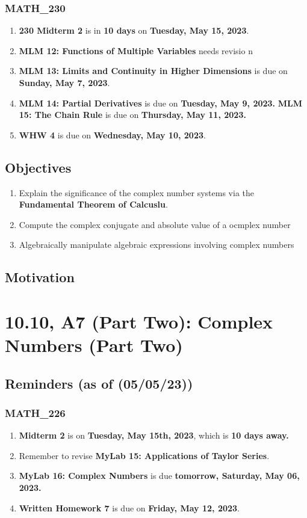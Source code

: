 \subsection{MATH\_230}
\begin{enumerate}
  \item \textbf{230 Midterm 2} is in \textbf{10 days} on
        \textbf{Tuesday, May 15, 2023}.
  \item \textbf{MLM 12: Functions of Multiple Variables} needs revisio n
  \item \textbf{MLM 13: Limits and Continuity in Higher
        Dimensions} is due on \textbf{Sunday, May 7, 2023}.
  \item \textbf{MLM 14: Partial Derivatives} is due on
        \textbf{Tuesday, May 9, 2023.}
        \textbf \textbf{MLM 15: The Chain Rule} is due on
        \textbf{Thursday, May 11, 2023.}
  \item \textbf{WHW 4} is due on \textbf{Wednesday,
        May 10, 2023}.

\end{enumerate}

\section{Objectives}
\begin{enumerate}
  \item Explain the significance of the complex number
        systems via the \textbf{Fundamental Theorem of
        Calcuslu}.
  \item Compute the complex conjugate and absolute
        value of a ocmplex number
  \item Algebraically manipulate algebraic expressions
        involving complex numbers
\end{enumerate}

\section{Motivation}
\chapter{10.10, A7 (Part Two): Complex Numbers (Part Two)}
\section{Reminders (as of (05/05/23))}
\subsection{MATH\_226}
\begin{enumerate}
  \item  \textbf{Midterm 2} is on \textbf{Tuesday, May 15th, 2023}, which is \textbf{10 days away.}
  \item Remember to revise \textbf{MyLab 15:
        Applications of Taylor Series}.
  \item \textbf{MyLab 16: Complex Numbers} is
        due \textbf{tomorrow, Saturday, May 06, 2023.}
  \item \textbf{Written Homework 7} is due on
        \textbf{Friday, May 12, 2023}.
\end{enumerate}
